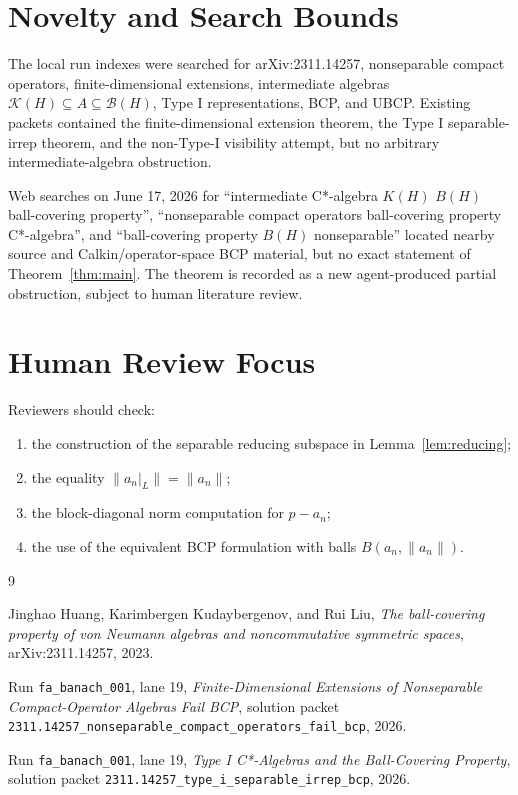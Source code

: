 \documentclass[11pt]{article}
\newcommand{\Kcal}{\mathcal K}
\newcommand{\Bcal}{\mathcal B}
\begin{document}
\section*{Novelty and Search Bounds}

The local run indexes were searched for arXiv:2311.14257, nonseparable
compact operators, finite-dimensional extensions, intermediate algebras
\(\Kcal(H)\subseteq A\subseteq\Bcal(H)\), Type I representations, BCP, and
UBCP.  Existing packets contained the finite-dimensional extension theorem,
the Type I separable-irrep theorem, and the non-Type-I visibility attempt,
but no arbitrary intermediate-algebra obstruction.

Web searches on June 17, 2026 for ``intermediate C*-algebra \(K(H)\) \(B(H)\)
ball-covering property'', ``nonseparable compact operators ball-covering
property C*-algebra'', and ``ball-covering property \(B(H)\) nonseparable''
located nearby source and Calkin/operator-space BCP material, but no exact
statement of Theorem~\ref{thm:main}.  The theorem is recorded as a new
agent-produced partial obstruction, subject to human literature review.

\section*{Human Review Focus}

Reviewers should check:
\begin{enumerate}
    \item the construction of the separable reducing subspace in
          Lemma~\ref{lem:reducing};
    \item the equality \(\|a_n|_L\|=\|a_n\|\);
    \item the block-diagonal norm computation for \(p-a_n\);
    \item the use of the equivalent BCP formulation with balls
          \(B(a_n,\|a_n\|)\).
\end{enumerate}

\begin{thebibliography}{9}

Jinghao Huang, Karimbergen Kudaybergenov, and Rui Liu,
\emph{The ball-covering property of von Neumann algebras and noncommutative
symmetric spaces},
arXiv:2311.14257, 2023.

Run \texttt{fa\_banach\_001}, lane 19,
\emph{Finite-Dimensional Extensions of Nonseparable Compact-Operator
Algebras Fail BCP},
solution packet
\texttt{2311.14257\_nonseparable\_compact\_operators\_fail\_bcp}, 2026.

Run \texttt{fa\_banach\_001}, lane 19,
\emph{Type I C*-Algebras and the Ball-Covering Property},
solution packet
\texttt{2311.14257\_type\_i\_separable\_irrep\_bcp}, 2026.

\end{thebibliography}
\end{document}
